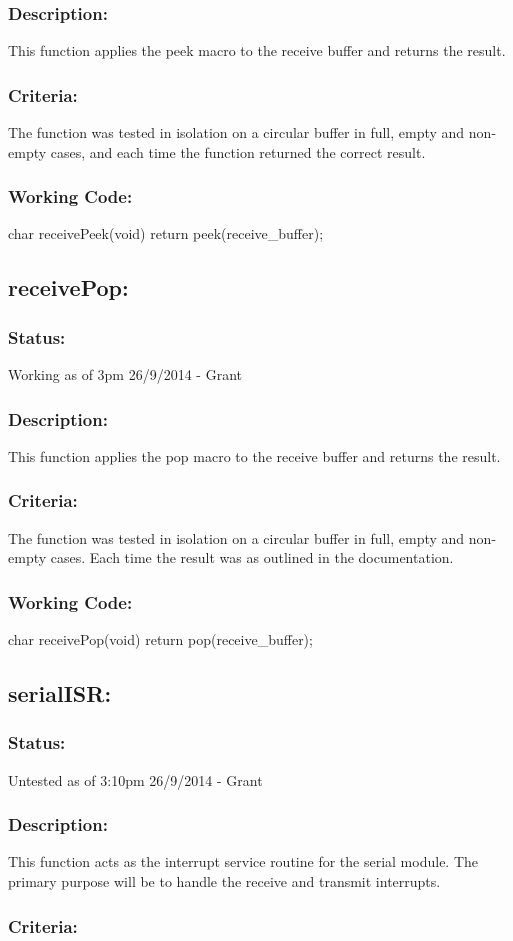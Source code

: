 \documentclass[]{article}
\begin{document}
\subsubsection{Description:}
This function applies the peek macro to the receive buffer and returns the result.

\subsubsection{Criteria:}
The function was tested in isolation on a circular buffer in full, empty and non-empty cases, and each time the function returned the correct result.

\subsubsection{Working Code:}
char receivePeek(void)
{
	return peek(receive\_buffer);
}

\subsection{receivePop:}
\subsubsection{Status:}
Working as of 3pm 26/9/2014 - Grant

\subsubsection{Description:}
This function applies the pop macro to the receive buffer and returns the result.

\subsubsection{Criteria:}
The function was tested in isolation on a circular buffer in full, empty and non-empty cases. Each time the result was as outlined in the documentation.

\subsubsection{Working Code:}
char receivePop(void)
{
	return pop(receive\_buffer);
}

\subsection{serialISR:}
\subsubsection{Status:}
Untested as of 3:10pm 26/9/2014 - Grant

\subsubsection{Description:}
This function acts as the interrupt service routine for the serial module. The primary purpose will be to handle the receive and transmit interrupts.

\subsubsection{Criteria:}

\newpage
\end{document}
